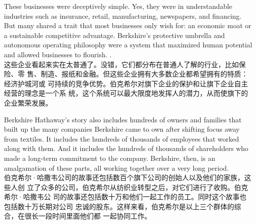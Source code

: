 \begin{verseparallel}
  {
    These businesses were deceptively simple. Yes, they were in understandable
    industries such as insurance, retail, manufacturing, newspapers, and
    financing. But many shared a trait that most businesses only wish for: an
    economic moat or a sustainable competitive advantage. Berkshire's protective
    umbrella and autonomous operating philosophy were a system that maximized
    human potential and allowed businesses to flourish. . \\
  }
  {
    这些企业看起来实在太普通了。没错，它们都分布在普通人了解的行业，比如保险、零
    售、制造、报纸和金融。但这些企业拥有大多数企业都希望拥有的特质：经济护城河或
    可持续的竞争优势。伯克希尔对旗下企业的保护和让旗下企业自主经营的理念是一个系
    统，这个系统可以最大限度地发挥人的潜力，从而使旗下的企业繁荣发展。
  }
\end{verseparallel}

\begin{verseparallel}
  {
    Berkshire Hathaway's story also includes hundreds of owners and families
    that built up the many companies Berkshire came to own after shifting focus
    away from textiles. It includes the hundreds of thousands of employees that
    worked along with them. And it includes the hundreds of thousands of
    shareholders who made a long-term commitment to the company. Berkshire,
    then, is an amalgamation of these parts, all working together over a very
    long period. \\
  }
  {
    伯克希尔·哈撒韦公司的故事还包括数百个旗下公司的创始人以及他们的家族，这些人创
    立了众多的公司，伯克希尔从纺织业转型之后，对它们进行了收购。伯克希尔·哈撒韦公
    司的故事还包括数十万和他们一起工作的员工。同时这个故事也包括数十万长期对公司
    忠诚的股东。这样来看，伯克希尔是以上三个群体的综合，在很长一段时间里面他们都
    一起协同工作。
  }
\end{verseparallel}

